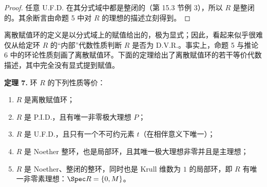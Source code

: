 \begin{proof}
任意 U.F.D. 在其分式域中都是整闭的（第 15.3 节例 3），所以 $R$ 是整闭的。其余断言由命题 5 中对 $R$ 的理想的描述立刻得到。
\end{proof}

离散赋值环的定义是以分式域上的赋值给出的，极为显式；因此，看起来似乎很难仅从给定环 $R$ 的“内部”代数性质判断 $R$ 是否为 D.V.R.。事实上，命题 5 与推论 6 中的环论性质刻画了离散赋值环。下面的定理给出了离散赋值环的若干等价代数描述，其中完全没有显式提到赋值。

\medskip
\noindent\textbf{定理 7.} 环 $R$ 的下列性质等价：
\begin{enumerate}[label=(\arabic*)]
  \item $R$ 是离散赋值环；
  \item $R$ 是 P.I.D.，且有唯一非零极大理想 $P$；
  \item $R$ 是 U.F.D.，且只有一个不可约元素 $t$（在相伴意义下唯一）；
  \item $R$ 是 Noether 整环，也是局部环，且其唯一极大理想非零并且是主理想；
  \item $R$ 是 Noether、整闭的整环，同时也是 Krull 维数为 $1$ 的局部环，即 $R$ 有唯一非零素理想：$\Spec R=\{0,M\}$。
\end{enumerate}


